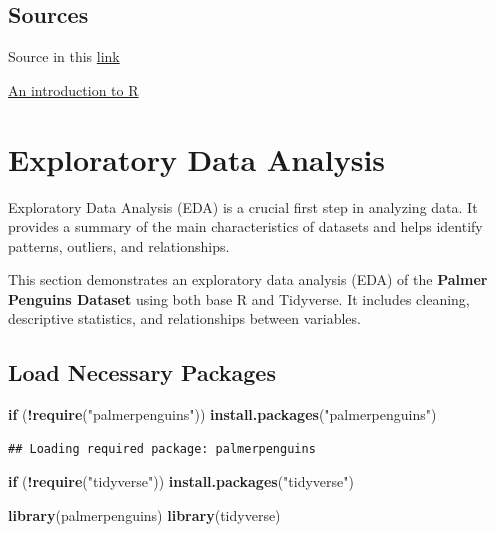 \documentclass[
]{book}
\newenvironment{Shaded}{\begin{snugshade}}{\end{snugshade}}
\newcommand{\ControlFlowTok}[1]{\textcolor[rgb]{0.13,0.29,0.53}{\textbf{#1}}}
\newcommand{\FunctionTok}[1]{\textcolor[rgb]{0.13,0.29,0.53}{\textbf{#1}}}
\newcommand{\NormalTok}[1]{#1}
\newcommand{\SpecialCharTok}[1]{\textcolor[rgb]{0.81,0.36,0.00}{\textbf{#1}}}
\newcommand{\StringTok}[1]{\textcolor[rgb]{0.31,0.60,0.02}{#1}}
\begin{document}
\hypertarget{sources}{%
\section{Sources}\label{sources}}

Source in this \href{https://estadistica-dma.ulpgc.es/cursoR4ULPGC/index.html}{link}

\href{https://intro2r.com/index.html}{An introduction to R}

\hypertarget{exploratory-data-analysis}{%
\chapter{Exploratory Data Analysis}\label{exploratory-data-analysis}}

Exploratory Data Analysis (EDA) is a crucial first step in analyzing data. It provides a summary of the main characteristics of datasets and helps identify patterns, outliers, and relationships.

This section demonstrates an exploratory data analysis (EDA) of the \textbf{Palmer Penguins Dataset} using both base R and Tidyverse. It includes cleaning, descriptive statistics, and relationships between variables.

\hypertarget{load-necessary-packages}{%
\section{Load Necessary Packages}\label{load-necessary-packages}}

\begin{Shaded}
\begin{Highlighting}[]
\ControlFlowTok{if}\NormalTok{ (}\SpecialCharTok{!}\FunctionTok{require}\NormalTok{(}\StringTok{"palmerpenguins"}\NormalTok{)) }\FunctionTok{install.packages}\NormalTok{(}\StringTok{"palmerpenguins"}\NormalTok{)}
\end{Highlighting}
\end{Shaded}

\begin{verbatim}
## Loading required package: palmerpenguins
\end{verbatim}

\begin{Shaded}
\begin{Highlighting}[]
\ControlFlowTok{if}\NormalTok{ (}\SpecialCharTok{!}\FunctionTok{require}\NormalTok{(}\StringTok{"tidyverse"}\NormalTok{)) }\FunctionTok{install.packages}\NormalTok{(}\StringTok{"tidyverse"}\NormalTok{)}

\FunctionTok{library}\NormalTok{(palmerpenguins)}
\FunctionTok{library}\NormalTok{(tidyverse)}
\end{Highlighting}
\end{Shaded}
\end{document}

